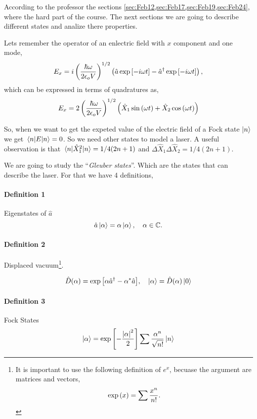 \documentclass[a4paper]{tufte-handout} %
\newcommand{\hata}{\hat{a}}
\newcommand{\hatad}{\hat{a}^\dagger}
\newcommand{\QDi}{\hat{X}_1}
\newcommand{\QDj}{\hat{X}_2}
\begin{document}
According to the professor the sections \ref{sec:Feb12,sec:Feb17,sec:Feb19,sec:Feb24}, where the hard part of the course.
The next sections we are going to describe different states and analize there properties.

Lets remember the operator of an enlectric field with $x$ component and one mode,
\begin{gather*}
    E_x = i\left(\frac{\hbar\omega}{2\epsilon_o V}\right)^{1/2}\left(\hata\exp\qty[-i\omega t] - \hatad\exp\qty[-i\omega t]\right),
\end{gather*}
which can be expressed in terms of quadratures as,
\begin{gather*}
    E_x = 2\left(\frac{\hbar\omega}{2\epsilon_o V}\right)^{1/2}\qty( \hat{X}_1\sin\qty(\omega t) +  \hat{X}_2\cos\qty(\omega t))
\end{gather*}

So, when we want to get the expeted value of the electric field of a Fock state $\ket{n}$ we get $\expval{E}{n}=0$.
So we need other states to model a laser.
A useful observation is that $\expval{\QDi^2}{n}=1/4(2n+1)$ and $\Delta\QDi\Delta\QDj=1/4(2n+1)$.

We are going to study the ``\textit{Gleuber states}''.
Which are the states that can describe the laser.
For that we have 4 definitions,
\paragraph{Definition 1}
Eigenstates of $\hata$ \[\hata\ket{\alpha}=\alpha\ket{\alpha},\quad\alpha\in\mathbb{C}.\]

\paragraph{Definition 2}
Displaced vacuum\footnote{
    It is important to use the following definition of $e^x$, becuase the argument are matrices and vectors,
\[\exp\qty(x)=\sum\frac{x^n}{n!}.\]
}.

\begin{gather*}
    \hat{D}\qty(\alpha) = \exp\qty[\alpha\hatad-\alpha^*\hata],\quad\ket{\alpha}=\hat{D}(\alpha)\ket{0}
\end{gather*}

\paragraph{Definition 3}
Fock States
\begin{gather*}
    \ket{\alpha} = \exp\qty[-\frac{\abs{\alpha}^2}{2}]\sum\frac{\alpha^n}{\sqrt{n!}}\ket{n}
\end{gather*}
\end{document}
